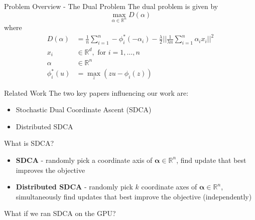 \documentclass{beamer}
\def \R {\mathbb{R}}
\def \R {\mathbb{R}}
\begin{document}
\begin{frame}{Problem Overview - The Dual Problem}
  The dual problem is given by
  \vspace{1em}
  \begin{equation}
    \max_{\alpha \in \R^n} D(\alpha)
  \end{equation}
  where 
  \begin{align*}
    D(\alpha) &= \frac{1}{n}\sum_{i=1}^n -\phi^*_i(-\alpha_i) -
    \frac{\lambda}{2}\Big|\Big|\frac{1}{\lambda n}\sum_{i=1}^n\alpha_i x_i\Big|\Big|^2\\
    x_i & \in \R^d, \text{ for } i = 1, \dots, n\\
    \alpha & \in \R^n\\
    \phi^*_i(u) &= \max_z (zu - \phi_i(z))
  \end{align*}
\end{frame}
%
\begin{frame}{Related Work}
  The two key papers influencing our work are:
	\begin{itemize}
	  \item  Stochastic Dual Coordinate Ascent (SDCA) \cite{shalev2013stochastic}
	  \item Distributed SDCA  \cite{yang2013trading,yang2013analysis}
	\end{itemize}
\end{frame}

\begin{frame}{What is SDCA?}
  \begin{itemize}
    \item \textbf{SDCA} - randomly pick a coordinate axis of $\mathbf{\alpha}
      \in \R^n$, find update that best improves
      the objective\vspace{1em}
    \item \textbf{Distributed SDCA} - randomly pick $k$ coordinate axes of
      $\mathbf{\alpha} \in \R^n$, simultaneously
      find updates that best improve the objective (independently)
  \end{itemize}
\end{frame}

\begin{frame}[standout]
  What if we ran SDCA on the GPU?
\end{frame}
\end{document}
